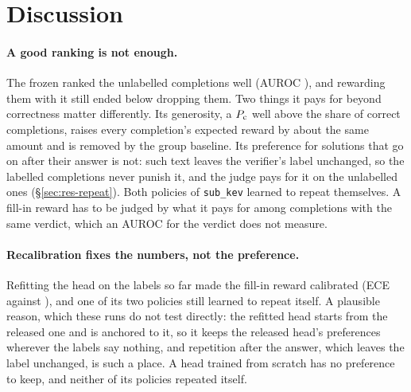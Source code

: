 
\section{Discussion}\label{sec:discussion}

\paragraph{A good ranking is not enough.} The frozen \kev{} ranked the unlabelled completions well (AUROC
), and rewarding them with it still ended below dropping them. Two things it pays for beyond
correctness matter differently. Its generosity, a $P_{\mathrm{c}}$ well above the share of correct completions, raises every
completion's expected reward by about the same amount and is removed by the group baseline. Its preference for
solutions that go on after their answer is not: such text leaves the verifier's label unchanged, so the labelled
completions never punish it, and the judge pays for it on the unlabelled ones (\S\ref{sec:res-repeat}). Both policies
of \texttt{sub\_kev} learned to repeat themselves. A fill-in reward has to be judged by what it pays for among
completions with the same verdict, which an AUROC for the verdict does not measure.

\paragraph{Recalibration fixes the numbers, not the preference.} Refitting the head on the labels so far made the
fill-in reward calibrated (ECE  against ), and one of its two
policies still learned to repeat itself. A plausible reason, which these runs do not test directly: the refitted head
starts from the released one and is anchored to it, so it keeps the released head's preferences wherever the labels
say nothing, and repetition after the answer, which leaves the label unchanged, is such a place. A head trained from
scratch has no preference to keep, and neither of its policies repeated itself.

